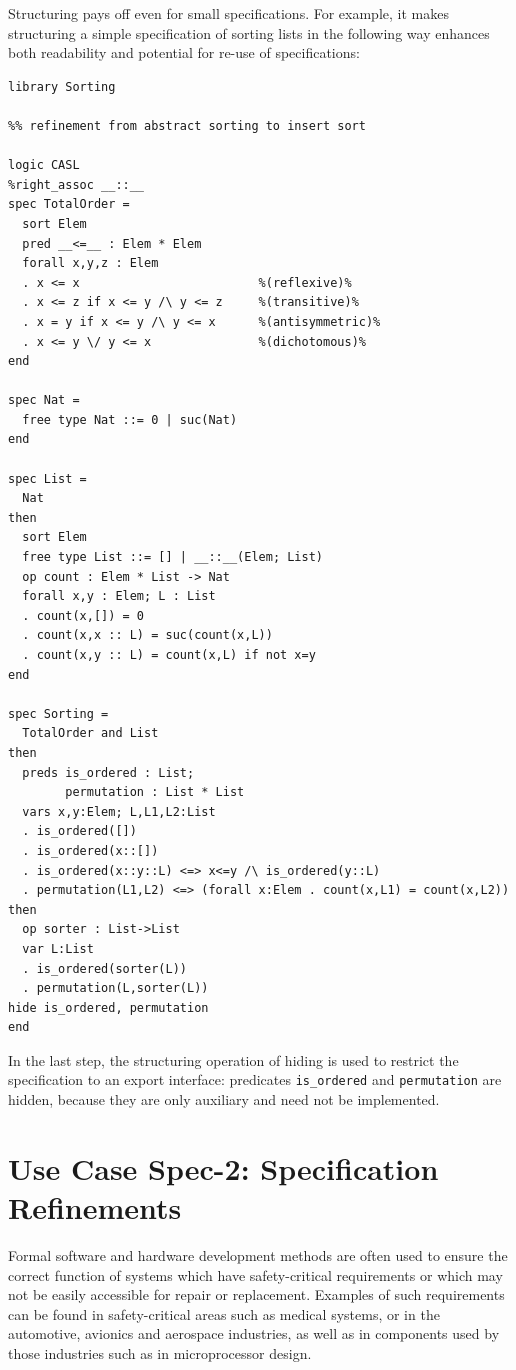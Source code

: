 \documentclass[10pt,fleqn,final]{scrreprt}
\newcommand{\cbs}[0]{\color{red}\xspace} %
\newcommand{\cbe}[0]{\color{black}\xspace} %
\newenvironment{definitions}[0]{\medskip }{}
\begin{document}
\begin{definitions}
Structuring pays off even for small specifications. For example, it makes
structuring a simple specification of sorting lists in the 
following way enhances both readability and potential for re-use
of specifications:

\begin{lstlisting}[basicstyle=\ttfamily\footnotesize,language=dolText,morekeywords={sort, ops, refinement, free,spec type, assoc, unit,props,op,spec,refined, via,generated, then,ObjectProperty,Class,DisjointUnionOf,SubClassOf,Characteristics,Transitive,Asymmetric,SubPropertyOf,DisjointClasses,EquivalentTo,inverse,only,forall,iff,if,or,exists,distributed,from},escapechar=@,mathescape]	
library Sorting

%% refinement from abstract sorting to insert sort

logic CASL
%right_assoc __::__
spec TotalOrder =
  sort Elem
  pred __<=__ : Elem * Elem
  forall x,y,z : Elem
  . x <= x                         %(reflexive)%
  . x <= z if x <= y /\ y <= z     %(transitive)%
  . x = y if x <= y /\ y <= x      %(antisymmetric)%
  . x <= y \/ y <= x               %(dichotomous)%
end

spec Nat =
  free type Nat ::= 0 | suc(Nat)
end

spec List =
  Nat
then
  sort Elem
  free type List ::= [] | __::__(Elem; List)
  op count : Elem * List -> Nat
  forall x,y : Elem; L : List
  . count(x,[]) = 0
  . count(x,x :: L) = suc(count(x,L))
  . count(x,y :: L) = count(x,L) if not x=y
end

spec Sorting =
  TotalOrder and List
then
  preds is_ordered : List;
        permutation : List * List
  vars x,y:Elem; L,L1,L2:List
  . is_ordered([])
  . is_ordered(x::[])
  . is_ordered(x::y::L) <=> x<=y /\ is_ordered(y::L)
  . permutation(L1,L2) <=> (forall x:Elem . count(x,L1) = count(x,L2))
then
  op sorter : List->List
  var L:List
  . is_ordered(sorter(L))
  . permutation(L,sorter(L))
hide is_ordered, permutation
end
\end{lstlisting}

In the last step, the structuring operation of hiding is used to
restrict the specification to an export interface:\cbs 
 predicates \texttt{is\_ordered} and \texttt{permutation} are hidden,\cbe because they
are only auxiliary and need not be implemented.


\section{Use Case Spec-2: Specification Refinements}\label{spec-2}
Formal software and hardware development methods are often used to
ensure the correct function of systems which have safety-critical
requirements or which may not be easily accessible for repair or
replacement.  Examples of such requirements can be found in
safety-critical areas such as medical systems, or in the automotive,
avionics and aerospace industries, as well as in components used by
those industries such as in microprocessor design.


\end{definitions}
\end{document}

